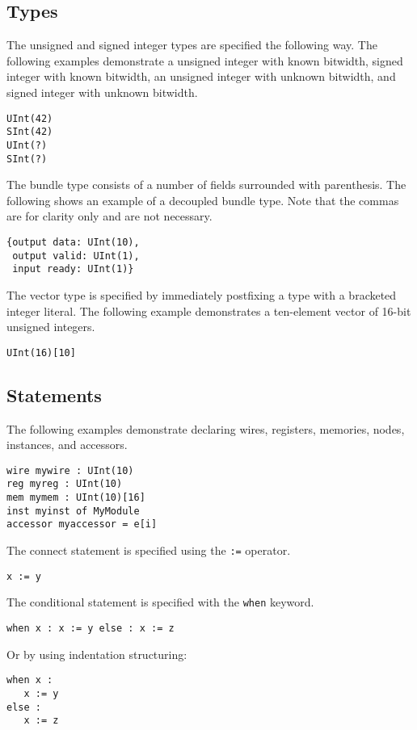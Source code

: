 \documentclass[12pt]{article}
\begin{document}
\subsection*{Types}
The unsigned and signed integer types are specified the following way.
The following examples demonstrate a unsigned integer with known bitwidth, signed integer with known bitwidth, an unsigned integer with unknown bitwidth, and signed integer with unknown bitwidth.
\begin{verbatim}
UInt(42)
SInt(42)
UInt(?)
SInt(?)
\end{verbatim}

The bundle type consists of a number of fields surrounded with parenthesis.
The following shows an example of a decoupled bundle type.
Note that the commas are for clarity only and are not necessary.
\begin{verbatim}
{output data: UInt(10),
 output valid: UInt(1),
 input ready: UInt(1)} 
\end{verbatim}

The vector type is specified by immediately postfixing a type with a bracketed integer literal.
The following example demonstrates a ten-element vector of 16-bit unsigned integers.
\begin{verbatim}
UInt(16)[10]
\end{verbatim}

\subsection*{Statements}
The following examples demonstrate declaring wires, registers, memories, nodes, instances, and accessors. 
\begin{verbatim}
wire mywire : UInt(10)
reg myreg : UInt(10)
mem mymem : UInt(10)[16]
inst myinst of MyModule
accessor myaccessor = e[i]
\end{verbatim}

The connect statement is specified using the \verb|:=| operator.
\begin{verbatim}
x := y
\end{verbatim}

The conditional statement is specified with the \verb|when| keyword.
\begin{verbatim}
when x : x := y else : x := z
\end{verbatim}
Or by using indentation structuring:
\begin{verbatim}
when x :
   x := y
else :
   x := z
\end{verbatim}
\end{document}
